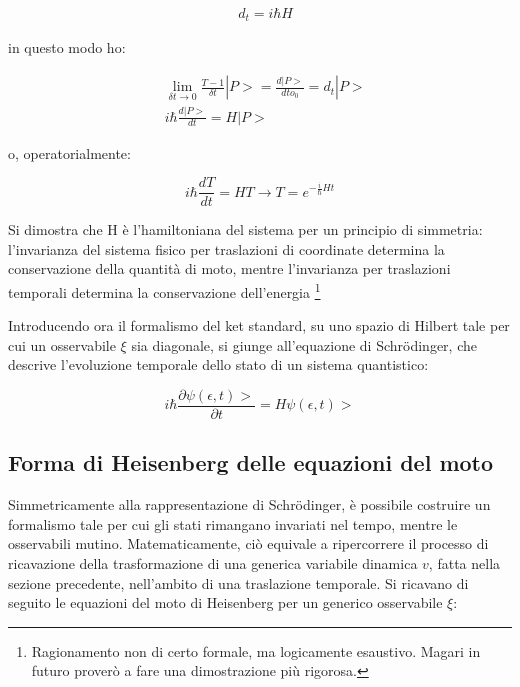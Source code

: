 \documentclass{article}
\begin{document}
\begin{equation}
    \begin{aligned}
         & d_t= i\hbar H
    \end{aligned}
\end{equation}

in questo modo ho:

\begin{equation}
    \begin{aligned}
         & \lim_{\delta t \rightarrow 0} \frac{T-1}{\delta t}|P>= \frac{d |P>}{d to_0}= d_t |P> \\
         & i\hbar \frac{d |P>}{dt}= H|P>
    \end{aligned}
\end{equation}

o, operatorialmente:

\begin{equation}
    i\hbar \frac{d T}{dt}= HT \rightarrow T=e^{-\frac{i}{\hbar}Ht}
\end{equation}

Si dimostra che H è l'hamiltoniana del sistema per un principio di simmetria:
l'invarianza del sistema fisico per traslazioni di coordinate determina la conservazione della quantità di moto,
mentre l'invarianza per traslazioni temporali determina la conservazione dell'energia \footnote{
    Ragionamento non di certo formale, ma logicamente esaustivo. Magari in futuro proverò a fare una dimostrazione
    più rigorosa.
}

Introducendo ora il formalismo del ket standard, su uno spazio di Hilbert tale per cui un osservabile $\xi$ sia diagonale,
si giunge all'equazione di Schrödinger, che descrive l'evoluzione temporale dello stato di un sistema quantistico:

\begin{equation}
    i\hbar \frac{\partial \psi(\epsilon,t)>}{\partial t}= H\psi(\epsilon,t)>
\end{equation}

\subsection{Forma di Heisenberg delle equazioni del moto}
Simmetricamente alla rappresentazione di Schrödinger, è possibile costruire un formalismo tale per cui gli stati rimangano invariati nel tempo,
mentre le osservabili mutino.
Matematicamente, ciò equivale a ripercorrere il processo di ricavazione della trasformazione di una generica variabile dinamica $v$, fatta nella sezione precedente,
nell'ambito di una traslazione temporale.
Si ricavano di seguito le equazioni del moto di Heisenberg per un generico osservabile $\xi$:
\end{document}
